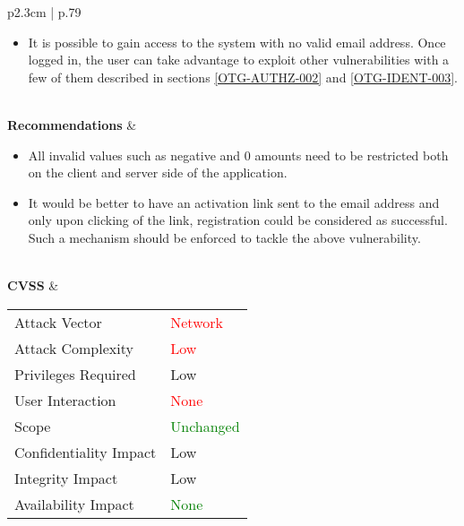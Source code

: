 \begin{longtable}[l]{ p{2.3cm} | p{.79\linewidth} }
\begin{itemize}
            \item It is possible to gain access to the system with no valid email address. Once logged in, the user can take advantage to exploit other vulnerabilities with a few of them described in sections \ref{OTG-AUTHZ-002} and \ref{OTG-IDENT-003}.
        \end{itemize}
    \\
    \textbf{Recommen\-dations} &
        \begin{itemize}
        \item All invalid values such as negative and 0 amounts need to be restricted both on the client and server side of the application.
        \item It would be better to have an activation link sent to the email address and only upon clicking of the link, registration could be considered as successful. Such a mechanism should be enforced to tackle the above vulnerability.
        \end{itemize}
    \\ \hline
    \textbf{CVSS} &
        \begin{tabular}[t]{@{}l | l}
            Attack Vector           & \textcolor{red}{Network} \\
            Attack Complexity       & \textcolor{red}{Low} \\
            Privileges Required     & \textcolor{BurntOrange}{Low} \\
            User Interaction        & \textcolor{red}{None} \\
            Scope                   & \textcolor{Green}{Unchanged} \\
            Confidentiality Impact  & \textcolor{BurntOrange}{Low} \\
            Integrity Impact        & \textcolor{BurntOrange}{Low} \\
            Availability Impact     & \textcolor{Green}{None}
        \end{tabular}
    \\ \hline
\end{longtable}
\clearpage

